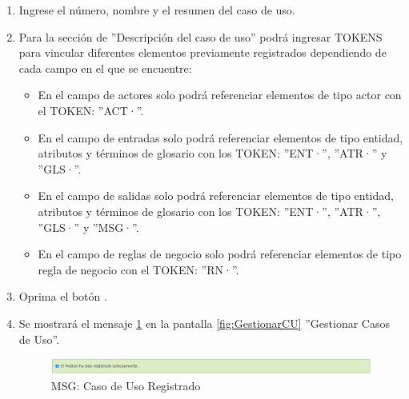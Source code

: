 \begin{enumerate}
			\item Ingrese el número, nombre  y el resumen del caso de uso.
			
			\item Para la sección de ''Descripción del caso de uso'' podrá ingresar TOKENS para vincular diferentes elementos previamente registrados dependiendo de cada campo en el que se encuentre:
			
			\begin{itemize}
				\item En el campo de actores solo podrá referenciar elementos de tipo actor con el TOKEN: ''ACT·''.
				\item En el campo de entradas solo podrá referenciar elementos de tipo entidad, atributos y términos de glosario con los TOKEN: ''ENT·'', ''ATR·'' y ''GLS·''.
				\item En el campo de salidas solo podrá referenciar elementos de tipo entidad, atributos y términos de glosario con los TOKEN: ''ENT·'', ''ATR·'', ''GLS·'' y ''MSG·''.
				\item En el campo de reglas de negocio solo podrá referenciar elementos de tipo regla de negocio con el TOKEN: ''RN·''.
			\end{itemize}
			
			\item Oprima el botón \IUAceptar.
			
			\item Se mostrará el mensaje \ref{fig:CURegistrado} en la pantalla \ref{fig:GestionarCU} ''Gestionar Casos de Uso''.
			
			\begin{figure}[htbp!]
				\begin{center}
					\includegraphics[scale=0.6]{roles/lider/casosUso/pantallas/IU5-1MSG1}
					\caption{MSG: Caso de Uso Registrado}
					\label{fig:CURegistrado}
				\end{center}
			\end{figure}
			\end{enumerate}
